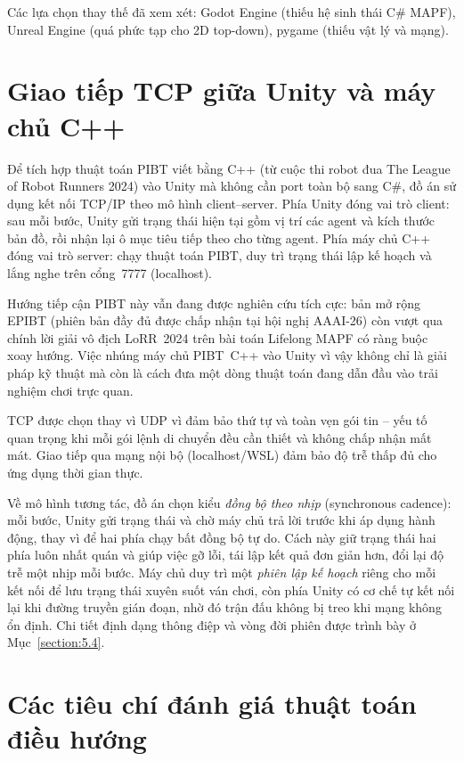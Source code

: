 \documentclass[../DoAn.tex]{subfiles}
\begin{document}
Các lựa chọn thay thế đã xem xét: Godot Engine (thiếu hệ sinh thái C\# MAPF),
Unreal Engine (quá phức tạp cho 2D top-down), pygame (thiếu vật lý và mạng).

\section{Giao tiếp TCP giữa Unity và máy chủ C++}
\label{section:3.5}

Để tích hợp thuật toán PIBT viết bằng C++ (từ cuộc thi robot đua The League of Robot
Runners 2024) vào Unity mà không cần port toàn bộ sang C\#, đồ án sử dụng kết nối
TCP/IP theo mô hình client--server. Phía Unity đóng vai trò client: sau mỗi bước, Unity
gửi trạng thái hiện tại gồm vị trí các agent và kích thước bản đồ, rồi nhận lại ô mục
tiêu tiếp theo cho từng agent. Phía máy chủ C++ đóng vai trò server: chạy thuật toán
PIBT, duy trì trạng thái lập kế hoạch và lắng nghe trên cổng~7777 (localhost).

Hướng tiếp cận PIBT này vẫn đang được nghiên cứu tích cực: bản mở rộng EPIBT
\cite{yukhnevich2025epibt} (phiên bản đầy đủ được chấp nhận tại hội nghị AAAI-26) còn
vượt qua chính lời giải vô địch LoRR~2024 trên bài toán Lifelong MAPF có ràng buộc xoay
hướng. Việc nhúng máy chủ PIBT~C++ vào Unity vì vậy không chỉ là giải pháp kỹ thuật mà
còn là cách đưa một dòng thuật toán đang dẫn đầu vào trải nghiệm chơi trực quan.

TCP được chọn thay vì UDP vì đảm bảo thứ tự và toàn vẹn gói tin -- yếu tố quan trọng khi
mỗi gói lệnh di chuyển đều cần thiết và không chấp nhận mất mát. Giao tiếp qua mạng nội
bộ (localhost/WSL) đảm bảo độ trễ thấp đủ cho ứng dụng thời gian thực.

Về mô hình tương tác, đồ án chọn kiểu \emph{đồng bộ theo nhịp} (synchronous cadence): mỗi bước,
Unity gửi trạng thái và chờ máy chủ trả lời trước khi áp dụng hành động, thay vì để hai phía chạy
bất đồng bộ tự do. Cách này giữ trạng thái hai phía luôn nhất quán và giúp việc gỡ lỗi, tái lập kết
quả đơn giản hơn, đổi lại độ trễ một nhịp mỗi bước. Máy chủ duy trì một \emph{phiên lập kế hoạch}
riêng cho mỗi kết nối để lưu trạng thái xuyên suốt ván chơi, còn phía Unity có cơ chế tự kết nối
lại khi đường truyền gián đoạn, nhờ đó trận đấu không bị treo khi mạng không ổn định. Chi tiết định
dạng thông điệp và vòng đời phiên được trình bày ở Mục~\ref{section:5.4}.

\section{Các tiêu chí đánh giá thuật toán điều hướng}
\label{section:3.6}
\end{document}

